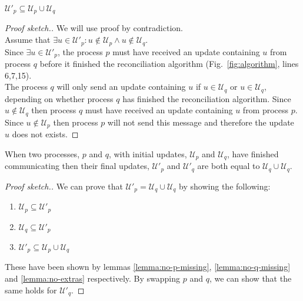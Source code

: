 \documentclass[manuscript,anonymous]{acmart}
\begin{document}
\begin{lemma}\label{lemma:no-extras}
$\mathcal{U}'_p \subseteq \mathcal{U}_p \cup \mathcal{U}_q$    
\end{lemma}
\begin{proof}[Proof sketch.]
We will use proof by contradiction.\\
Assume that $\exists u \in \mathcal{U}'_p: u \notin \mathcal{U}_p  \land  u \notin \mathcal{U}_q$.\\
Since $\exists u \in \mathcal{U}'_p$, the process $p$ must have received an update containing $u$ from process $q$ before it finished the reconciliation algorithm (Fig.~\ref{fig:algorithm}, lines 6,7,15).\\
The process $q$ will only send an update containing $u$ if $u \in \mathcal{U}_q$ or $u \in \mathcal{U}_q$, depending on whether process $q$ has finished the reconciliation algorithm.
Since $u \notin \mathcal{U}_q$ then process $q$ must have received an update containing $u$ from process $p$.
Since $u \notin \mathcal{U}_p$ then process $p$ will not send this message and therefore the update $u$ does not exists.
\end{proof}

\begin{theorem}
When two processes, $p$ and $q$, with initial updates, $\mathcal{U}_p$ and $\mathcal{U}_q$, have finished communicating then their final updates, $\mathcal{U}'_p$ and $\mathcal{U}'_q$  are both equal to $\mathcal{U}_q \cup \mathcal{U}_q$.
\end{theorem}
\begin{proof}[Proof sketch.]
We can prove that $\mathcal{U}'_p = \mathcal{U}_q \cup \mathcal{U}_q$ by showing the following:
\begin{enumerate}
   \item $\mathcal{U}_p \subseteq \mathcal{U}'_p$
   \item $\mathcal{U}_q \subseteq \mathcal{U}'_p$
   \item $\mathcal{U}'_p \subseteq \mathcal{U}_p \cup \mathcal{U}_q$
\end{enumerate}

These have been shown by lemmas \ref{lemma:no-p-missing}, \ref{lemma:no-q-missing} and \ref{lemma:no-extras} respectively.  
By swapping $p$ and $q$, we can show that the same holds for $\mathcal{U}'_q$.
\end{proof}

\end{document}

